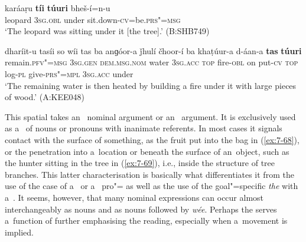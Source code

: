 \begin{exe}
\ex
\label{ex:7-66}
\gll karáaṛu \textbf{tíi} \textbf{túuri} bheš-í=n-u \\
leopard \textsc{3sg.obl} under sit.down-\textsc{cv}=be.\textsc{prs"=msg } \\
\glt `The leopard was sitting under it [the tree].' (B:SHB749)
\end{exe}
\begin{exe}
\ex
\label{ex:7-67}
\gll dharíit-u tasíi so wíi tas ba anɡóor-a ǰhulí čhoor-í ba khaṭúur-a d-áan-a \textbf{tas} \textbf{túuri}\\
remain.\textsc{pfv"=msg} \textsc{3sg.gen} \textsc{dem.msg.nom} water \textsc{3sg.acc} \textsc{top} fire-\textsc{obl} on put-\textsc{cv} \textsc{top} log-\textsc{pl} give-\textsc{prs"=mpl } \textsc{3sg.acc} under\\
\glt `The remaining water is then heated by building a fire under it with large pieces of wood.' (A:KEE048)
\end{exe}

 This spatial  takes an~ nominal argument or an~  argument. It is exclusively used as a~ of nouns or pronouns with inanimate referents. In most cases it signals contact with the surface of something, as the fruit put into the bag in (\ref{ex:7-68}), or the penetration into a~location or beneath the surface of an~object, such as the hunter sitting in the tree in (\ref{ex:7-69}), i.e., inside the structure of tree branches. This latter characterisation is basically what differentiates it from the  use of the  case of a~ or a~ pro"= as well as the use of the goal"=specific  \textit{the} with a~. It seems, however, that many  nominal expressions can occur almost interchangeably as  nouns and as nouns followed by \textit{wée}. Perhaps the  serves a~function of further emphasising the  reading, especially when a~movement is implied.

